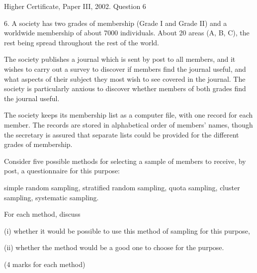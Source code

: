 \documentclass[a4paper,12pt]{article}
\begin{document}
Higher Certificate, Paper III, 2002. Question 6
\begin{framed}
6. A society has two grades of membership (Grade I and Grade II) and a worldwide membership of about 7000 individuals.  
About 20%
areas (A, B, C), the rest being spread throughout the rest of the world. 
 
The society publishes a journal which is sent by post to all members, and it wishes to carry out a survey to discover if 
members find the journal useful, and what aspects of their subject they most wish to see covered in the journal.  
The society is particularly anxious to discover whether members of both grades find the journal useful. 
 
The society keeps its membership list as a computer file, with one record for each member.  
The records are stored in alphabetical order of members' names, though the secretary is assured that separate lists 
could be provided for the different grades of membership. 
 
Consider five possible methods for selecting a sample of members to receive, by post, a questionnaire for this purpose: 
 
 simple random sampling,  stratified random sampling,  quota sampling,  cluster sampling,  systematic sampling. 
 
For each method, discuss 
 
(i) whether it would be possible to use this method of sampling for this purpose, 
 
(ii) whether the method would be a good one to choose for the purpose. 
 
 
(4 marks for each method) 
 
\end{framed}
\end{document}
